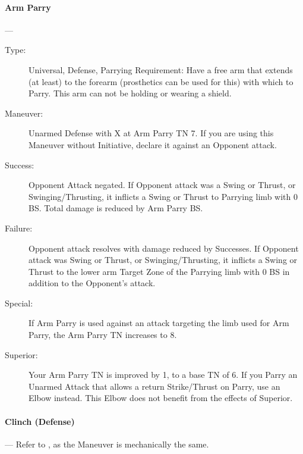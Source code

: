 \documentclass[oneside,11pt,english]{book}
\begin{document}
\paragraph{\large\label{man:Arm Parry}Arm Parry}---\quad{\large[X]}
\vspace{-10pt}\begin{description} 
\item [Type:] Universal, Defense, Parrying 
Requirement: Have a free arm that extends (at least) to the forearm (prosthetics can be used for this) with 
which to Parry. This arm can not be holding or wearing a shield. 
\item [Maneuver:] Unarmed Defense with X at Arm Parry TN 7. If you are using this Maneuver without 
Initiative, declare it against an Opponent attack. 
\item [Success:] Opponent Attack negated. If Opponent attack was a Swing or Thrust, or Swinging/Thrusting, it 
inflicts a Swing or Thrust to Parrying limb with 0 BS. Total damage is reduced by Arm Parry BS. 
\item [Failure:] Opponent attack resolves with damage reduced by Successes. If Opponent attack was Swing or 
Thrust, or Swinging/Thrusting, it inflicts a Swing or Thrust to the lower arm Target Zone of the Parrying 
limb with 0 BS in addition to the Opponent’s attack. 
\item [Special:] If Arm Parry is used against an attack targeting the limb used for Arm Parry, the Arm Parry TN 
increases to 8. 
\item [Superior:] Your Arm Parry TN is improved by 1, to a base TN of 6. If you Parry an Unarmed Attack that 
allows a return Strike/Thrust on Parry, use an Elbow instead. This Elbow does not benefit from the effects 
of Superior. 
\end{description}

\paragraph{\large\label{man:Clinch (Defense)}Clinch (Defense)}---\quad{[X]}
Refer to , as the Maneuver is mechanically the same.
\end{document}
